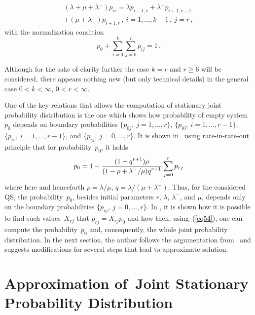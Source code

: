 \begin{multicols}{2}
\vspace*{-12pt}

\noindent
\begin{multline}
\left(\lambda+\mu+\lambda^-\right)p_{ir}=\lambda p_{i-1,r}+ \lambda^- p_{i+1,r-1}\\ +
\left(\mu + \lambda^-\right) p_{i+1,r}\,,\  
i=1 ,\dots , k-1\,, \ j=r\,,
\label{eq38}
\end{multline}
with the normalization condition
\begin{equation*}
p_{0} + \sum\limits_{i=0}^k \sum\limits_{j=0}^r p_{ij} = 1\,.
\end{equation*}

Although for the sake of clarity further the case $k=r$
and $r \ge 6$ will be considered, there appears nothing new (but only technical details) 
in the general case $0<k<\infty$, $0<r<\infty$.

One of the key relations that allows the computation
of stationary joint probability distribution is the one which shows how
probability of empty system~$p_0$ depends on boundary probabilities
$\{ p_{0j}, \ j=1,\dots ,r \}$, $\{ p_{i0}, \ i=1,\dots ,r-1 \}$,
$\{ p_{ir}, \ i=1,\dots ,r-1 \}$, and $\{ p_{rj}, \ j=0 ,\dots , r \}$.
It is shown in~\cite{aaa6} using rate-in-rate-out principle
that for probability~$p_0$, it holds
\begin{equation}
p_0 = 1- \displaystyle\frac{\displaystyle  (1-q^{r+1} )\rho \mathstrut}{\displaystyle (1-\rho + \lambda^-/\mu) q^{r+1}\mathstrut}
 \sum\limits_{j=0}^{r}p_{rj} 
\label{eq54}
\end{equation}
where here and henceforth $\rho=\lambda/\mu$, $q=\lambda/(\mu+\lambda^-)$.
 Thus, for the considered QS, the probability~$p_0$, 
 besides initial parameters $r$, $\lambda$, $\lambda^-$, and $\mu$, depends only on the boundary 
probabilities $\{ p_{rj}, \ j=0 ,\dots , r \}$.
In \cite{aaa6}, it is shown how it is possible to find such values~$X_{rj}$ 
that $p_{rj}=X_{rj} p_0$ and how then, using~(\ref{eq54}), one can compute 
the probability~$p_0$ and, consequently, the whole joint probability distribution. 
In the next section, the author follows the argumentation from~\cite{aaa6}
and suggests modifications for several steps that lead to approximate solution. 

\section{Approximation of~Joint Stationary Probability Distribution}


\end{multicols}
